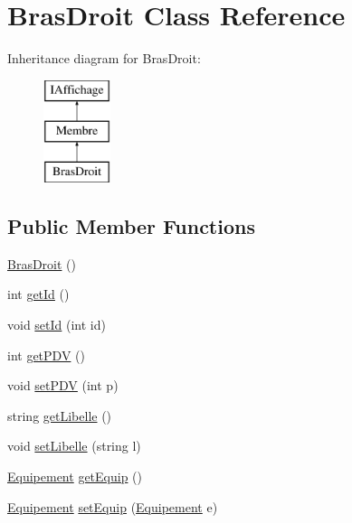\hypertarget{class_bras_droit}{\section{\-Bras\-Droit \-Class \-Reference}
\label{class_bras_droit}
}
\-Inheritance diagram for \-Bras\-Droit\-:\begin{figure}[H]
\begin{center}
\leavevmode
\includegraphics[height=3.000000cm]{class_bras_droit}
\end{center}
\end{figure}
\subsection*{\-Public \-Member \-Functions}
\begin{DoxyCompactItemize}
\item 
\hyperlink{class_bras_droit_a5478c047502eac41e3c300dccb8bb3d1}{\-Bras\-Droit} ()
\item 
int \hyperlink{class_bras_droit_a9be3f4a94a82e95caa78aaabc6357c2b}{get\-Id} ()
\item 
void \hyperlink{class_bras_droit_a156189452ba3e3d037ecca9b21d294cb}{set\-Id} (int id)
\item 
int \hyperlink{class_bras_droit_adddfb977411421906d39f4bd4a35daf1}{get\-P\-D\-V} ()
\item 
void \hyperlink{class_bras_droit_a519053f32bea237a7fe8f7c93d9a0152}{set\-P\-D\-V} (int p)
\item 
string \hyperlink{class_bras_droit_a6db96c33ab1043b39127277d1920a63f}{get\-Libelle} ()
\item 
void \hyperlink{class_bras_droit_adc1f6283b4e00813a099b5cc9b9f8d76}{set\-Libelle} (string l)
\item 
\hyperlink{class_equipement}{\-Equipement} \hyperlink{class_bras_droit_a9af72d2589c8c33cc5e5d5e666424957}{get\-Equip} ()
\item 
\hyperlink{class_equipement}{\-Equipement} \hyperlink{class_bras_droit_a726fd8be859bbb27257118ad4c3647dc}{set\-Equip} (\hyperlink{class_equipement}{\-Equipement} e)
\end{DoxyCompactItemize}


